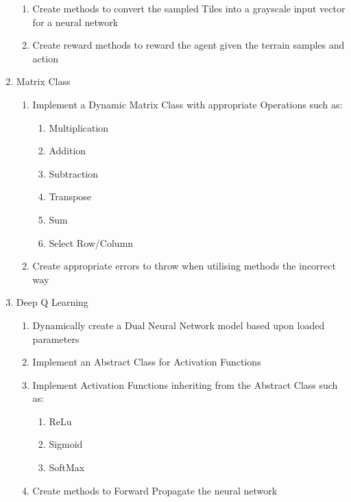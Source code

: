 \begin{flushleft}
\begin{enumerate}
\begin{enumerate}
                        \item Create methods to convert the sampled Tiles into a grayscale input vector for a neural network
                        \item Create reward methods to reward the agent given the terrain samples and action
                    \end{enumerate}   
                \item Matrix Class
                    \begin{enumerate}
                        \item Implement a Dynamic Matrix Class with appropriate Operations such as:
                            \begin{enumerate}
                                \item Multiplication
                                \item Addition
                                \item Subtraction
                                \item Transpose
                                \item Sum
                                \item Select Row/Column
                            \end{enumerate}
                        \item Create appropriate errors to throw when utilising methods the incorrect way
                    \end{enumerate}   
                \item Deep Q Learning
                    \begin{enumerate}
                        \item Dynamically create a Dual Neural Network model based upon loaded parameters
                        \item Implement an Abstract Class for Activation Functions
                        \item Implement Activation Functions inheriting from the Abstract Class such as:
                        \begin{enumerate}
                            \item ReLu
                            \item Sigmoid
                            \item SoftMax
                        \end{enumerate}
                        \item Create methods to Forward Propagate the neural network

\end{enumerate}
\end{enumerate}
\end{flushleft}
